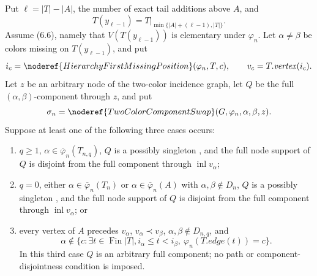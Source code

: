 \begin{lemma}
Put $\ell=|T|-|A|$, the number of exact tail additions above $A$, and
\[
 T(y_{\ell-1})=T\big|_{\min\{|A|+(\ell-1),|T|\}}.
\]
Assume (6.6), namely that $V(T(y_{\ell-1}))$ is elementary under
$\varphi_n$.  Let $\alpha\ne\beta$ be colors missing on
$T(y_{\ell-1})$, and put
\[
 i_c=\noderef{HierarchyFirstMissingPosition}(\varphi_n,T,c),
 \qquad v_c=T.\mathit{vertex}(i_c).
\]
Let $z$ be an arbitrary node of the two-color incidence graph, let $Q$
be the full $(\alpha,\beta)$-component through $z$, and put
\[
 \sigma_n=\noderef{TwoColorComponentSwap}
       (G,\varphi_n,\alpha,\beta,z).
\]
Suppose at least one of the following three cases occurs:
\begin{enumerate}
\item $q\geq1$, $\alpha\in\overline\varphi_n(T_{n,q})$, $Q$ is a
possibly singleton , and the full node
support of $Q$ is disjoint from the full component through
$\operatorname{inl}v_\alpha$;
\item $q=0$, either $\alpha\in\overline\varphi_n(T_n)$ or
$\alpha\in\overline\varphi_n(A)$ with $\alpha,\beta\notin D_n$, $Q$ is
a possibly singleton , and the full node
support of $Q$ is disjoint from the full component through
$\operatorname{inl}v_\alpha$; or
\item every vertex of $A$ precedes $v_\alpha$,
$v_\alpha\prec v_\beta$, $\alpha,\beta\notin D_{n,q}$, and
\[
 \alpha\notin
 \{c:\exists t\in\operatorname{Fin}|T|,
        i_\alpha\leq t<i_\beta,
        \ \varphi_n(T.\mathit{edge}(t))=c\}.                 \tag{U}
\]
In this third case $Q$ is an arbitrary full component; no path or
component-disjointness condition is imposed.
\end{enumerate}


\end{lemma}
